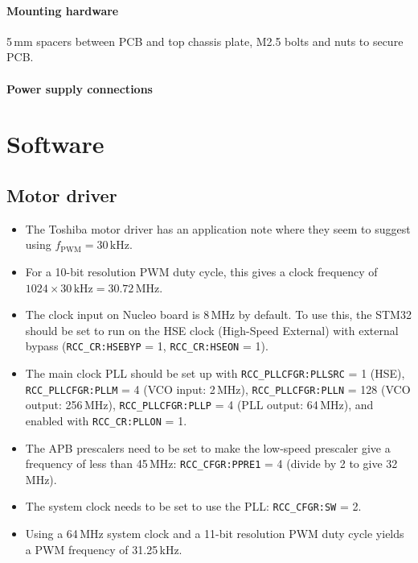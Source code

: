 \documentclass[a4paper,11pt,article]{memoir}
\begin{document}
\paragraph{Mounting hardware}

5\,mm spacers between PCB and top chassis plate, M2.5 bolts and nuts
to secure PCB.

\paragraph{Power supply connections}


\section*{Software}

\subsection*{Motor driver}

\begin{itemize}
  \item{The Toshiba motor driver has an application note where they
    seem to suggest using $f_{\mathrm{PWM}} = 30\,\mathrm{kHz}$.}
  \item{For a 10-bit resolution PWM duty cycle, this gives a clock
    frequency of $1024 \times 30\,\mathrm{kHz} = 30.72\,\mathrm{MHz}$.}
  \item{The clock input on Nucleo board is 8\,MHz by default. To use
    this, the STM32 should be set to run on the HSE clock (High-Speed
    External) with external bypass (\texttt{RCC\_CR:HSEBYP} = 1,
    \texttt{RCC\_CR:HSEON} = 1).}
  \item{The main clock PLL should be set up with
    \texttt{RCC\_PLLCFGR:PLLSRC} = 1 (HSE), \texttt{RCC\_PLLCFGR:PLLM}
    = 4 (VCO input: 2\,MHz), \texttt{RCC\_PLLCFGR:PLLN} = 128 (VCO
    output: 256\,MHz), \texttt{RCC\_PLLCFGR:PLLP} = 4 (PLL output:
    64\,MHz), and enabled with \texttt{RCC\_CR:PLLON} = 1.}
  \item{The APB prescalers need to be set to make the low-speed
    prescaler give a frequency of less than 45\,MHz:
    \texttt{RCC\_CFGR:PPRE1} = 4 (divide by 2 to give 32\,MHz).}
  \item{The system clock needs to be set to use the PLL:
    \texttt{RCC\_CFGR:SW} = 2.}
  \item{Using a 64\,MHz system clock and a 11-bit resolution PWM duty
    cycle yields a PWM frequency of 31.25\,kHz.}
\end{itemize}
\end{document}
